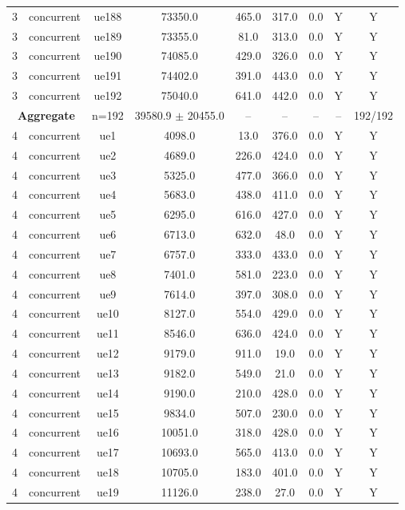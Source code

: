 \begin{table}[ht]
\begin{tabular}{|c|c|c|c|c|c|c|c|c|}
3 & concurrent & ue188 & 73350.0 & 465.0 & 317.0 & 0.0 & Y & Y \\
3 & concurrent & ue189 & 73355.0 & 81.0 & 313.0 & 0.0 & Y & Y \\
3 & concurrent & ue190 & 74085.0 & 429.0 & 326.0 & 0.0 & Y & Y \\
3 & concurrent & ue191 & 74402.0 & 391.0 & 443.0 & 0.0 & Y & Y \\
3 & concurrent & ue192 & 75040.0 & 641.0 & 442.0 & 0.0 & Y & Y \\
\multicolumn{2}{|c|}{\textbf{Aggregate}} & n=192 & 39580.9 $\pm$ 20455.0 & -- & -- & -- & -- & 192/192 \\
\hline
4 & concurrent & ue1 & 4098.0 & 13.0 & 376.0 & 0.0 & Y & Y \\
4 & concurrent & ue2 & 4689.0 & 226.0 & 424.0 & 0.0 & Y & Y \\
4 & concurrent & ue3 & 5325.0 & 477.0 & 366.0 & 0.0 & Y & Y \\
4 & concurrent & ue4 & 5683.0 & 438.0 & 411.0 & 0.0 & Y & Y \\
4 & concurrent & ue5 & 6295.0 & 616.0 & 427.0 & 0.0 & Y & Y \\
4 & concurrent & ue6 & 6713.0 & 632.0 & 48.0 & 0.0 & Y & Y \\
4 & concurrent & ue7 & 6757.0 & 333.0 & 433.0 & 0.0 & Y & Y \\
4 & concurrent & ue8 & 7401.0 & 581.0 & 223.0 & 0.0 & Y & Y \\
4 & concurrent & ue9 & 7614.0 & 397.0 & 308.0 & 0.0 & Y & Y \\
4 & concurrent & ue10 & 8127.0 & 554.0 & 429.0 & 0.0 & Y & Y \\
4 & concurrent & ue11 & 8546.0 & 636.0 & 424.0 & 0.0 & Y & Y \\
4 & concurrent & ue12 & 9179.0 & 911.0 & 19.0 & 0.0 & Y & Y \\
4 & concurrent & ue13 & 9182.0 & 549.0 & 21.0 & 0.0 & Y & Y \\
4 & concurrent & ue14 & 9190.0 & 210.0 & 428.0 & 0.0 & Y & Y \\
4 & concurrent & ue15 & 9834.0 & 507.0 & 230.0 & 0.0 & Y & Y \\
4 & concurrent & ue16 & 10051.0 & 318.0 & 428.0 & 0.0 & Y & Y \\
4 & concurrent & ue17 & 10693.0 & 565.0 & 413.0 & 0.0 & Y & Y \\
4 & concurrent & ue18 & 10705.0 & 183.0 & 401.0 & 0.0 & Y & Y \\
4 & concurrent & ue19 & 11126.0 & 238.0 & 27.0 & 0.0 & Y & Y \\

\end{tabular}
\end{table}
